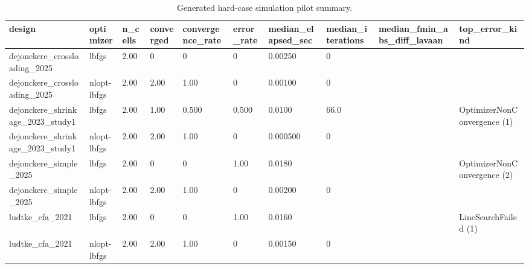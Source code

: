 \begin{table}[ht]
\centering
\caption{Generated hard-case simulation pilot summary.}
\begin{tabular}{llllllllll}
\hline
design & optimizer & n\_cells & converged & convergence\_rate & error\_rate & median\_elapsed\_sec & median\_iterations & median\_fmin\_abs\_diff\_lavaan & top\_error\_kind
\\ \hline
dejonckere\_crossloading\_2025 & lbfgs & 2.00 & 0 & 0 & 0 & 0.00250 & 0 &  &  \\
dejonckere\_crossloading\_2025 & nlopt-lbfgs & 2.00 & 2.00 & 1.00 & 0 & 0.00100 & 0 &  &  \\
dejonckere\_shrinkage\_2023\_study1 & lbfgs & 2.00 & 1.00 & 0.500 & 0.500 & 0.0100 & 66.0 &  & OptimizerNonConvergence (1) \\
dejonckere\_shrinkage\_2023\_study1 & nlopt-lbfgs & 2.00 & 2.00 & 1.00 & 0 & 0.000500 & 0 &  &  \\
dejonckere\_simple\_2025 & lbfgs & 2.00 & 0 & 0 & 1.00 & 0.0180 &  &  & OptimizerNonConvergence (2) \\
dejonckere\_simple\_2025 & nlopt-lbfgs & 2.00 & 2.00 & 1.00 & 0 & 0.00200 & 0 &  &  \\
ludtke\_cfa\_2021 & lbfgs & 2.00 & 0 & 0 & 1.00 & 0.0160 &  &  & LineSearchFailed (1) \\
ludtke\_cfa\_2021 & nlopt-lbfgs & 2.00 & 2.00 & 1.00 & 0 & 0.00150 & 0 &  &  \\
\hline
\end{tabular}
\end{table}
